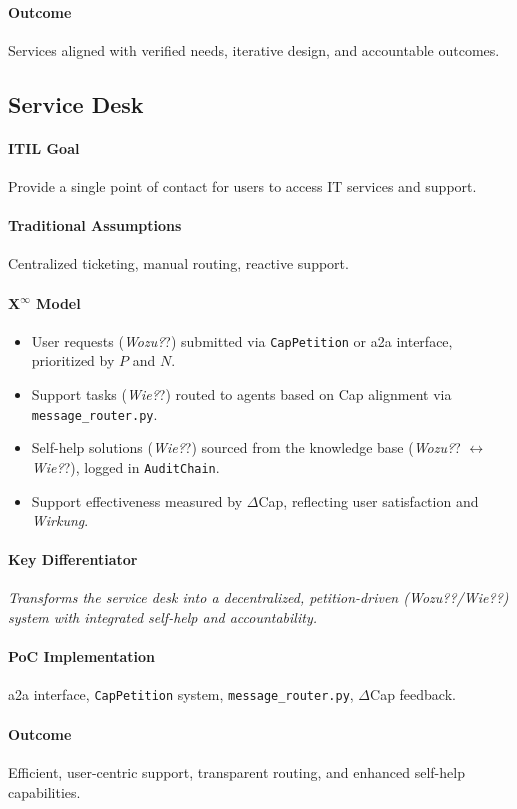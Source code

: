 \documentclass[12pt, a4paper]{scrartcl}
\newcommand{\Xinf}{X$^\infty$}                        %
\newcommand{\DeltaCap}{$\Delta$Cap}                    %
\newcommand{\Wirkung}{\textit{Wirkung}}                 %
\newcommand{\AuditChain}{\texttt{AuditChain}}
\newcommand{\CapPetition}{\texttt{CapPetition}}        %
\newcommand{\Wozu}{\textit{Wozu?}}                      %
\newcommand{\Wie}{\textit{Wie?}}                        %
\begin{document}
\paragraph{Outcome} Services aligned with verified needs, iterative design, and accountable outcomes.

\subsection{Service Desk} %
\paragraph{ITIL Goal} Provide a single point of contact for users to access IT services and support.
\paragraph{Traditional Assumptions} Centralized ticketing, manual routing, reactive support.
\paragraph*{\Xinf{} Model}
\begin{itemize}
    \item User requests (\Wozu?) submitted via \CapPetition{} or a2a interface, prioritized by $P$ and $N$.
    \item Support tasks (\Wie?) routed to agents based on Cap alignment via \texttt{message\_router.py}.
    \item Self-help solutions (\Wie?) sourced from the knowledge base (\Wozu? $\leftrightarrow$ \Wie?), logged in \AuditChain{}. %
    \item Support effectiveness measured by \DeltaCap{}, reflecting user satisfaction and \Wirkung{}.
\end{itemize}
\paragraph{Key Differentiator} \textit{Transforms the service desk into a decentralized, petition-driven (\Wozu?/\Wie?) system with integrated self-help and accountability.}
\paragraph{PoC Implementation} a2a interface, \CapPetition{} system, \texttt{message\_router.py}, \DeltaCap{} feedback.
\paragraph{Outcome} Efficient, user-centric support, transparent routing, and enhanced self-help capabilities.
\end{document}
